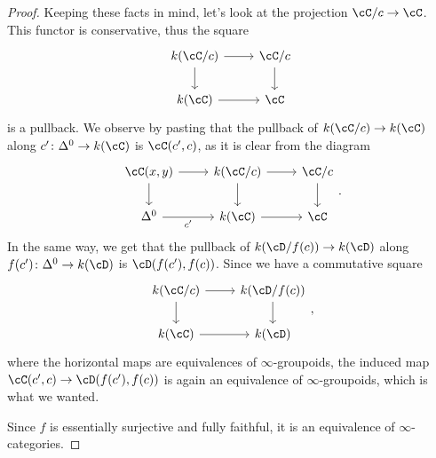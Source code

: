 \begin{proof}
  \noindent
  Keeping these facts in mind, let's look at the projection
  $\cC/c\rightarrow\cC$. This functor is conservative, thus the square
  \[\begin{tikzcd}
    {k(\cC/c)} & {\cC/c} \\
    {k(\cC)} & \cC
    \arrow[from=1-1, to=2-1]
    \arrow[from=2-1, to=2-2]
    \arrow[from=1-2, to=2-2]
    \arrow[from=1-1, to=1-2]
  \end{tikzcd}\]
  is a pullback. We observe by pasting that the pullback of $k(\cC/c)\rightarrow
  k(\cC)$ along $c'\colon\Delta^0\rightarrow k(\cC)$ is $\cC(c',c)$, as it is
  clear from the diagram
  \[\begin{tikzcd}
    {\cC(x,y)} & {k(\cC/c)} & {\cC/c} \\
    {\Delta^0} & {k(\cC)} & \cC
    \arrow[from=1-2, to=2-2]
    \arrow[from=2-2, to=2-3]
    \arrow[from=1-3, to=2-3]
    \arrow[from=1-2, to=1-3]
    \arrow["{c'}"', from=2-1, to=2-2]
    \arrow[from=1-1, to=2-1]
    \arrow[from=1-1, to=1-2]
  \end{tikzcd}.\]
  In the same way, we get that the pullback of $k(\cD/f(c))\rightarrow k(\cD)$
  along $f(c')\colon\Delta^0\rightarrow k(\cD)$ is $\cD(f(c'),f(c))$. Since we
  have a commutative square
  \[\begin{tikzcd}
    {k(\cC/c)} & {k(\cD/f(c))} \\
    {k(\cC)} & {k(\cD)}
    \arrow[from=1-2, to=2-2]
    \arrow[from=1-1, to=1-2]
    \arrow[from=2-1, to=2-2]
    \arrow[from=1-1, to=2-1]
  \end{tikzcd},\]
  where the horizontal maps are equivalences of $\infty$-groupoids, the
  induced map $\cC(c',c)\rightarrow\cD(f(c'),f(c))$ is again an equivalence of
  $\infty$-groupoids, which is what we wanted.

  \noindent
  Since $f$ is essentially surjective and fully faithful, it is an equivalence
  of $\infty$-categories.
\end{proof}

